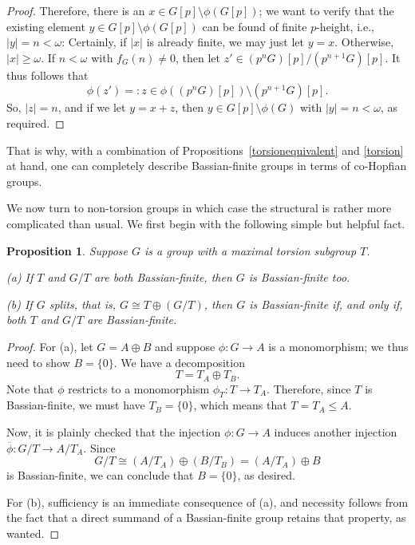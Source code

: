 \documentclass[12pt]{amsart}
\newtheorem{proposition}[theorem]{Proposition}
\theoremstyle{definition}
\def\val#1{\vert #1 \vert}
\begin{document}
\begin{proof}
Therefore, there is an $x\in G[p]\setminus \phi(G[p])$; we want to verify that the existing element $y\in G[p]\setminus \phi(G[p])$ can be found of finite $p$-height, i.e., $\val y=n<\omega$: Certainly, if $\val x$ is already finite, we may just let $y=x$. Otherwise, $\val x\geq \omega$. If $n<\omega$ with $f_G(n)\ne 0$, then let $z'\in (p^n G)[p]/(p^{n+1} G)[p]$. It thus follows that $$\phi(z')=: z\in \phi((p^n G)[p])\setminus (p^{n+1} G)[p].$$ So, $\val z=n$, and if we let $y=x+z$, then $y\in G[p]\setminus \phi(G)$ with $\val y=n<\omega$, as required.
\end{proof}

That is why, with a combination of Propositions~\ref{torsionequivalent} and \ref{torsion} at hand, one can completely describe Bassian-finite groups in terms of co-Hopfian groups.

\medskip

We now turn to non-torsion groups in which case the structural is rather more complicated than usual. We first begin with the following simple but helpful fact.

\begin{proposition} Suppose $G$ is a group with a maximal torsion subgroup $T$.

(a) If $T$ and $G/T$ are both Bassian-finite, then $G$ is Bassian-finite too.

(b) If $G$ splits, that is, $G\cong T\oplus (G/T)$, then $G$ is Bassian-finite if, and only if, both $T$ and $G/T$ are Bassian-finite.
\end{proposition}

\begin{proof}
For (a), let $G=A\oplus B$ and suppose $\phi:G\to A$ is a monomorphism; we thus need to show $B=\{0\}$. We have a decomposition
$$
                     T=T_A\oplus T_B.
$$
Note that $\phi$ restricts to a monomorphism $\phi_T:T\to T_A$. Therefore, since $T$ is Bassian-finite, we must have $T_B=\{0\}$, which means that $T=T_A\leq A$.

Now, it is plainly checked that the injection $\phi:G\to A$ induces another injection
$\overline \phi:G/T\to A/T_A$. Since
$$
            G/T\cong (A/T_A)\oplus (B/T_B)= (A/T_A)\oplus B
$$
is Bassian-finite, we can conclude that $B=\{0\}$, as desired.

For (b), sufficiency is an immediate consequence of (a), and necessity follows from the fact that a direct summand of a Bassian-finite group retains that property, as wanted.
\end{proof}
\end{document}
